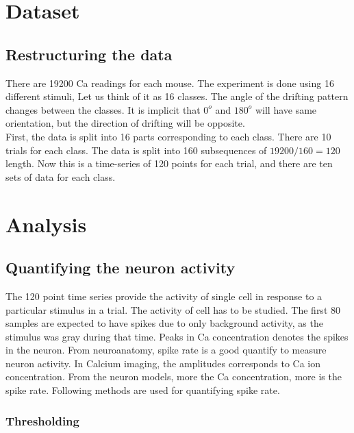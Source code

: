 \documentclass[11pt]{article}
\begin{document}
\section{Dataset} %
\label{sec:dataset}

\subsection{Restructuring the data} %
\label{sub:restructuring_the_data}
There are 19200 Ca readings for each mouse. The experiment is done using 16 different stimuli, Let us think of it as 16 classes. The angle of the drifting pattern changes between the classes. It is implicit that $0^{o}$ and $180^{o}$ will have same orientation, but the direction of drifting will be opposite.\\
First, the data is split into 16 parts corresponding to each class. There are 10 trials for each class. The data is split into 160 subsequences of $19200/160 = 120$ length. Now this is a time-series of 120 points for each trial, and there are ten sets of data for each class.

\section{Analysis} %
\label{sec:analysis}
\subsection{Quantifying the neuron activity} %
\label{sub:quantifying_the_neuron_activity}
The 120 point time series provide the activity of single cell in response to a particular stimulus in a trial. The activity of cell has to be studied. The first 80 samples are expected to have spikes due to only background activity, as the stimulus was gray during that time. Peaks in Ca concentration denotes the spikes in the neuron. From neuroanatomy, spike rate is a good quantify to measure neuron activity. In Calcium imaging, the amplitudes corresponds to Ca ion concentration. From the neuron models, more the Ca concentration, more is the spike rate. Following methods are used for quantifying spike rate.
\subsubsection{Thresholding} %
\label{ssub:thresholding}


\end{document}
